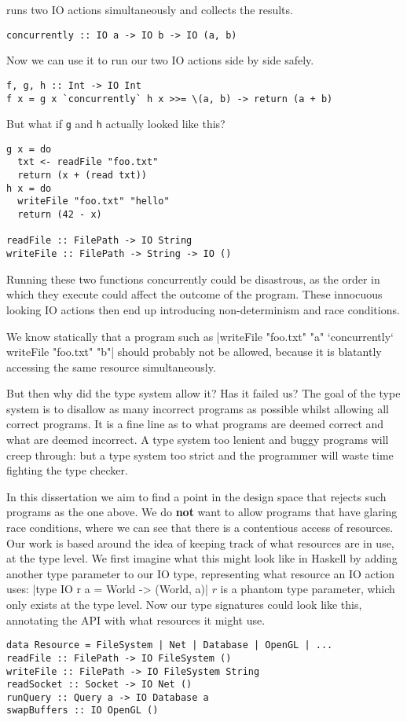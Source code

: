 \documentclass{report}
\begin{document}
runs two IO actions simultaneously and collects the results.
\begin{verbatim}
concurrently :: IO a -> IO b -> IO (a, b)
\end{verbatim}
Now we can use it to run our two IO actions side by side safely. 
\begin{verbatim}
f, g, h :: Int -> IO Int
f x = g x `concurrently` h x >>= \(a, b) -> return (a + b)
\end{verbatim}
But what if \texttt{g} and \texttt{h} actually looked like this?
\begin{verbatim}
g x = do
  txt <- readFile "foo.txt"
  return (x + (read txt))
h x = do
  writeFile "foo.txt" "hello"
  return (42 - x)

readFile :: FilePath -> IO String
writeFile :: FilePath -> String -> IO ()
\end{verbatim}

Running these two functions concurrently could be disastrous, as the order in
which they execute could affect the outcome of the program. These innocuous
looking IO actions then end up introducing non-determinism and race conditions.
\begin{samepage}
We know statically that a program such as
|writeFile "foo.txt" "a" `concurrently` writeFile "foo.txt" "b"|
\noindent should probably not be allowed, because it is blatantly accessing the
same resource simultaneously.
\end{samepage}
But then why did the type system allow it?  Has it failed us? The goal of the
type system is to disallow as many incorrect programs as possible whilst
allowing all correct programs. It is a fine line as to what programs are
deemed correct and what are deemed incorrect. A type system too lenient and
buggy programs will creep through: but a type system too strict and the
programmer will waste time fighting the type checker.

In this dissertation we aim to find a point in the design space that rejects
such programs as the one above. We do \textbf{not} want to allow programs that
have glaring race conditions, where we can see that there is a contentious
access of resources. Our work is based around the idea of keeping track of what
resources are in use, at the type level. We first imagine what this might look
like in Haskell by adding another type parameter to
our IO type, representing what resource an IO action uses:
|type IO r a = World -> (World, a)|
$r$ is a phantom type parameter, which only exists at the type level. Now our
type signatures could look like this, annotating the API with what resources it
might use.
\begin{verbatim}
data Resource = FileSystem | Net | Database | OpenGL | ...
readFile :: FilePath -> IO FileSystem ()
writeFile :: FilePath -> IO FileSystem String
readSocket :: Socket -> IO Net ()
runQuery :: Query a -> IO Database a
swapBuffers :: IO OpenGL ()
\end{verbatim}
\end{document}
